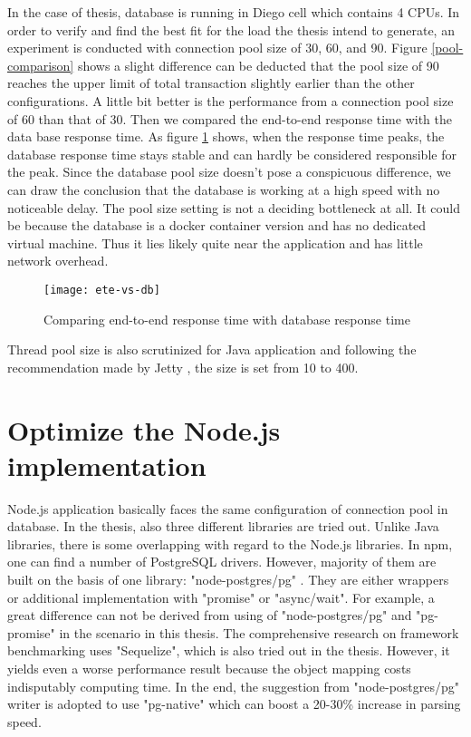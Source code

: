 In the case of thesis, database is running in Diego cell which contains 4 CPUs. In order to verify and find the best fit for the load the thesis intend to generate, an experiment is conducted with connection pool size of 30, 60, and 90.  Figure \ref{pool-comparison} shows a slight difference can be deducted that the pool size of 90 reaches the upper limit of total transaction slightly earlier than the other configurations. A little bit better is the performance from a connection pool size of 60 than that of 30. Then we compared the end-to-end response time with the data base response time.  As figure \ref{ete-vs-db} shows, when the response time peaks, the database response time stays stable and can hardly be considered responsible for the peak. Since the database pool size doesn't pose a conspicuous difference, we can draw the conclusion that the database is working at a high speed with no noticeable delay. The pool size setting is not a deciding bottleneck at all. It could be because the database is a docker container version and has no dedicated virtual machine. Thus it lies likely quite near the application and has little network overhead. 

\begin{figure}[h]
	\centering
	\texttt{[image: ete-vs-db]}
	\caption{Comparing end-to-end response time with database response time}
	\label{ete-vs-db}
\end{figure}

Thread pool size is also scrutinized for Java application and following the recommendation made by Jetty \citep{threadpool}, the size is set from 10 to 400. \\


\section{Optimize the Node.js implementation}
Node.js application basically faces the same configuration of connection pool in database. In the thesis, also three different libraries are tried out. Unlike Java libraries, there is some overlapping with regard to the Node.js libraries. In npm, one can find a number of PostgreSQL drivers. However, majority of them are built on the basis of one library: "node-postgres/pg" \citep{node-pg}. They are either wrappers or additional implementation with "promise" or "async/wait". For example, a great difference can not be derived from using of "node-postgres/pg" and "pg-promise" in the scenario in this thesis. The comprehensive research on framework benchmarking \citep{Benchmark} uses "Sequelize", which is also tried out in the thesis. However, it yields even a worse performance result because the object mapping costs indisputably computing time. In the end, the suggestion from "node-postgres/pg" writer is adopted to use "pg-native" which can boost a 20-30\% increase in parsing speed.\\




